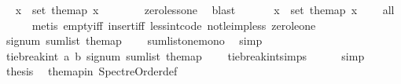 \begin{isabellebody}
\ \isamarkupfalse%
\ {\isachardoublequoteopen}{\isasymexists}x\ {\isasymin}\ set\ the{\isacharunderscore}{\kern0pt}map{\isachardot}{\kern0pt}\ x\ {\isachargreater}{\kern0pt}\ {}{\isachardoublequoteclose}\isanewline
\ \ \ \ \isamarkupfalse%
\ zero{\isacharunderscore}{\kern0pt}less{\isacharunderscore}{\kern0pt}one\ \isamarkupfalse%
\ blast\ \isanewline
\ \ \isamarkupfalse%
\ \isamarkupfalse%
\ {\isachardoublequoteopen}{\isasymforall}x\ {\isasymin}\ set\ the{\isacharunderscore}{\kern0pt}map{\isachardot}{\kern0pt}\ x\ {\isasymge}\ {}{\isachardoublequoteclose}\ \isamarkupfalse%
\ all{}{}\isanewline
\ \ \ \ \isamarkupfalse%
\ {\isacharparenleft}{\kern0pt}metis\ empty{\isacharunderscore}{\kern0pt}iff\ insert{\isacharunderscore}{\kern0pt}iff\ less{\isacharunderscore}{\kern0pt}int{\isacharunderscore}{\kern0pt}code{\isacharparenleft}{\kern0pt}{}{\isacharparenright}{\kern0pt}\ not{\isacharunderscore}{\kern0pt}le{\isacharunderscore}{\kern0pt}imp{\isacharunderscore}{\kern0pt}less\ zero{\isacharunderscore}{\kern0pt}le{\isacharunderscore}{\kern0pt}one{\isacharparenright}{\kern0pt}\ \isanewline
\ \ \isamarkupfalse%
\ \isamarkupfalse%
\ {\isachardoublequoteopen}signum\ {\isacharparenleft}{\kern0pt}sum{\isacharunderscore}{\kern0pt}list\ the{\isacharunderscore}{\kern0pt}map{\isacharparenright}{\kern0pt}\ {\isacharequal}{\kern0pt}\ {}{\isachardoublequoteclose}\ \isamarkupfalse%
\ sumlist{\isacharunderscore}{\kern0pt}one{\isacharunderscore}{\kern0pt}mono\ \isamarkupfalse%
\ simp\isanewline
\ \ \isamarkupfalse%
\ \isamarkupfalse%
\ {\isachardoublequoteopen}tie{\isacharunderscore}{\kern0pt}break{\isacharunderscore}{\kern0pt}int\ a\ b\ {\isacharparenleft}{\kern0pt}signum\ {\isacharparenleft}{\kern0pt}sum{\isacharunderscore}{\kern0pt}list\ the{\isacharunderscore}{\kern0pt}map{\isacharparenright}{\kern0pt}{\isacharparenright}{\kern0pt}\ {\isacharequal}{\kern0pt}\ {}{\isachardoublequoteclose}\ \isamarkupfalse%
\ tie{\isacharunderscore}{\kern0pt}break{\isacharunderscore}{\kern0pt}int{\isachardot}{\kern0pt}simps\isanewline
\ \ \ \ \isamarkupfalse%
\ simp\isanewline
\ \ \isamarkupfalse%
\ \isamarkupfalse%
\ {\isacharquery}{\kern0pt}thesis\ \isamarkupfalse%
\ the{\isacharunderscore}{\kern0pt}map{\isacharunderscore}{\kern0pt}in\ Spectre{\isacharunderscore}{\kern0pt}Order{\isacharunderscore}{\kern0pt}def\ \isamarkupfalse%

\end{isabellebody}
